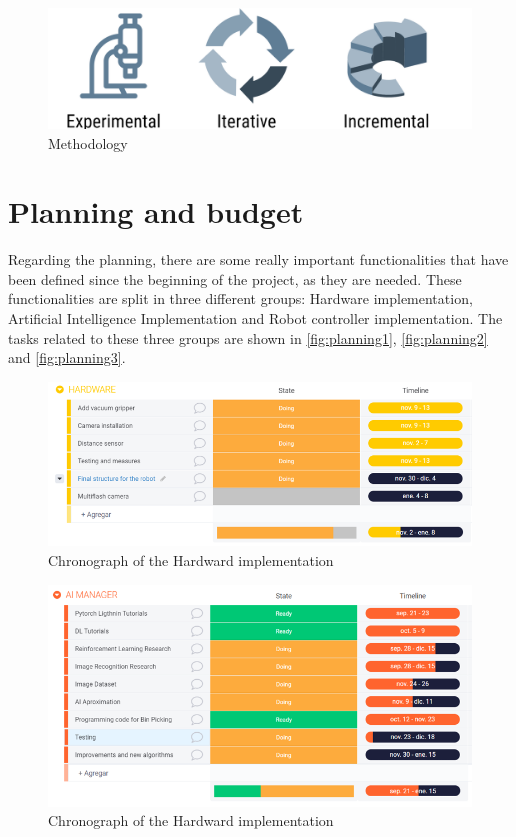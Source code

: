 		\begin{figure}
			\centering
			\includegraphics[width=0.85\linewidth]{Images/methodology}
			\caption[Methodology]{Methodology}
			\label{fig:methodology}
		\end{figure}
		
	
	\section{Planning and budget}
	
			Regarding the planning, there are some really important functionalities that have been defined since the beginning of the project, as they are needed. These functionalities are split in three different groups: Hardware implementation, Artificial Intelligence Implementation and Robot controller implementation. The tasks related to these three groups are shown in \autoref{fig:planning1}, \autoref{fig:planning2} and \autoref{fig:planning3}. 
		
		\begin{figure}
			\centering
			\includegraphics[width=0.85\linewidth]{Images/planning1}
			\caption[Chronograph HW]{Chronograph of the Hardward implementation}
			\label{fig:planning1}
		\end{figure}
	
		\begin{figure}
			\centering
			\includegraphics[width=0.85\linewidth]{Images/planning2}
			\caption[Chronograph HW]{Chronograph of the Hardward implementation}
			\label{fig:planning2}
		\end{figure}
		
